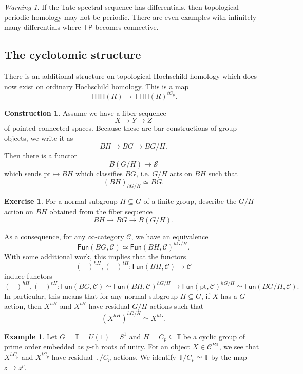 \documentclass[10pt, oneside]{memoir}
\theoremstyle{definition}
\newtheorem{con}[thm]{Construction}
\newtheorem{exm}[thm]{Example}
\newtheorem{exer}[thm]{Exercise}
\theoremstyle{remark}
\newtheorem{warn}[thm]{Warning}
\theoremstyle{plain}
\theoremstyle{definition}
\theoremstyle{remark}
\newcommand{\mc}[1]{\mathcal{#1}}
\newcommand{\T}{\mathbb{T}}
\newcommand{\mr}[1]{\mathrm{#1}}
\newcommand{\ms}[1]{\mathsf{#1}}
\newcommand{\1}{\mathbf{1}}
\newcommand{\2}{\mathbf{2}}
\newcommand{\3}{\mathbf{3}}
\newcommand{\pt}{\mr{pt}}
\newcommand{\THH}{\ms{THH}}
\newcommand{\TP}{\ms{TP}}
\begin{document}
\begin{warn}
    If the Tate spectral sequence has differentials, then topological periodic homology may not be periodic. There are even examples with infinitely many differentials where \(\TP \) becomes connective.
\end{warn}


\subsection{The cyclotomic structure}%
\label{sub:The cyclotomic structure}

There is an additional structure on topological Hochschild homology which does now exist on ordinary Hochschild homology. This is a map
\[ \THH(R) \to \THH(R)^{tC_p}. \]

\begin{con}
    Assume we have a fiber sequence
    \[ X \to Y \to Z \]
    of pointed connected spaces. Because these are bar constructions of group objects, we write it as
    \[ BH \to BG \to BG/H. \]
    Then there is a functor
    \[ B(G/H) \to \mc{S} \]
    which sends \(\pt \mapsto BH \) which classifies \(BG \), i.e. \(G/H \) acts on \(BH \) such that
    \[ (BH)_{h G/H} \simeq BG. \]
\end{con}

\begin{exer}
    For a normal subgroup \(H \subseteq G \) of a finite group, describe the \(G/H \)-action on \(BH \) obtained from the fiber sequence
    \[ BH \to BG \to B(G/H). \]
\end{exer}

As a consequence, for any \(\infty \)-category \(\mc{C} \), we have an equivalence
\[ \ms{Fun}(BG, \mc{C}) \simeq \ms{Fun}(BH, \mc{C})^{h G/H}. \]
With some additional work, this implies that the functors
\[ (-)^{hH}, (-)^{tH} \colon \ms{Fun}(BH, \mc{C}) \to \mc{C} \]
induce functors
\[ (-)^{hH}, (-)^{tH} \colon \ms{Fun}(BG, \mc{C}) \simeq \ms{Fun}(BH, \mc{C})^{hG/H} \to \ms{Fun}(\pt, \mc{C})^{hG/H} \simeq \ms{Fun}(BG/H, \mc{C}). \]
In particular, this means that for any normal subgroup \(H \subseteq G \), if \(X \) has a \(G \)-action, then \(X^{hH} \) and \(X^{tH} \) have residual \(G/H \)-actions such that
\[ (X^{hH})^{hG/H} \simeq X^{hG}. \]

\begin{exm}
    Let \(G = \T = U(1) = S^1 \) and \(H = C_p \subseteq \T \) be a cyclic group of prime order embedded as \(p \)-th roots of unity. For an object \(X \in \mc{C}^{B\T} \), we see that \(X^{hC_p} \) and \(X^{tC_p} \) have residual \(\T/C_p \)-actions. We identify \(\T/C_p \simeq \T \) by the map \(z \mapsto z^p \).
\end{exm}
\end{document}
